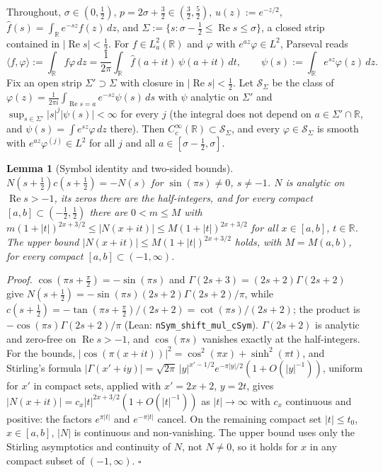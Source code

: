 \documentclass[11pt,a4paper]{article}
\newtheorem{lem}{Lemma}[section]
\begin{document}
Throughout, $\sigma\in(0,\tfrac12)$, $p=2\sigma+\tfrac32\in(\tfrac32,\tfrac52)$, $u(z):=e^{-z/2}$,
$\widehat{f}(s)=\int_{\mathbb{R}}e^{-sz}f(z)\,dz$, and $\Sigma:=\{s:\sigma-\tfrac12\le\operatorname{Re}s\le\sigma\}$, a closed
strip contained in $|\operatorname{Re}s|<\tfrac12$.  For $f\in L^2_a(\mathbb{R})$ and $\varphi$ with $e^{az}\varphi\in L^2$, Parseval reads
\begin{equation}\label{eq:conj_parseval}
\langle f,\varphi\rangle:=\int_{\mathbb{R}}f\varphi\,dz=\frac{1}{2\pi}\int_{\mathbb{R}}\widehat{f}(a+it)\,\psi(a+it)\,dt,
\qquad \psi(s):=\int_{\mathbb{R}}e^{sz}\varphi(z)\,dz .
\end{equation}
Fix an open strip $\Sigma'\supset\Sigma$ with closure in $|\operatorname{Re}s|<\tfrac12$.  Let $\mathcal{S}_\Sigma$ be the class of
$\varphi(z)=\frac{1}{2\pi i}\int_{\operatorname{Re}s=a}e^{-sz}\psi(s)\,ds$ with $\psi$ analytic on $\Sigma'$ and
$\sup_{s\in\Sigma'}|s|^j|\psi(s)|<\infty$ for every $j$ (the integral does not depend on $a\in\Sigma'\cap\mathbb{R}$, and
$\psi(s)=\int e^{sz}\varphi\,dz$ there).  Then $C_c^\infty(\mathbb{R})\subset\mathcal{S}_\Sigma$, and every
$\varphi\in\mathcal{S}_\Sigma$ is smooth with $e^{az}\varphi^{(j)}\in L^2$ for all $j$ and all $a\in[\sigma-\tfrac12,\sigma]$.

\begin{lem}[Symbol identity and two-sided bounds]\label{lem:conj_symbol}
$N(s+\tfrac12)c(s+\tfrac12)=-N(s)$ for $\sin(\pi s)\ne0$, $s\ne-1$.  $N$ is analytic on $\operatorname{Re}s>-1$, its zeros
there are the half-integers, and for every compact $[a,b]\subset(-\tfrac12,\tfrac12)$ there are $0<m\le M$ with
$m(1+|t|)^{2x+3/2}\le|N(x+it)|\le M(1+|t|)^{2x+3/2}$ for all $x\in[a,b]$, $t\in\mathbb{R}$.
The upper bound $|N(x+it)|\le M(1+|t|)^{2x+3/2}$ holds, with $M=M(a,b)$, for every compact $[a,b]\subset(-1,\infty)$.
\end{lem}
\textit{Proof.}
$\cos(\pi s+\tfrac{\pi}{2})=-\sin(\pi s)$ and $\Gamma(2s+3)=(2s+2)\Gamma(2s+2)$ give
$N(s+\tfrac12)=-\sin(\pi s)(2s+2)\Gamma(2s+2)/\pi$, while $c(s+\tfrac12)=-\tan(\pi s+\tfrac{\pi}{2})/(2s+2)=\cot(\pi s)/(2s+2)$;
the product is $-\cos(\pi s)\Gamma(2s+2)/\pi$ (Lean: \texttt{nSym\_shift\_mul\_cSym}).
$\Gamma(2s+2)$ is analytic and zero-free on $\operatorname{Re}s>-1$, and $\cos(\pi s)$ vanishes exactly at the half-integers.
For the bounds, $|\cos(\pi(x+it))|^2=\cos^2(\pi x)+\sinh^2(\pi t)$, and Stirling's formula
$|\Gamma(x'+iy)|=\sqrt{2\pi}\,|y|^{x'-1/2}e^{-\pi|y|/2}(1+O(|y|^{-1}))$, uniform for $x'$ in compact sets, applied with
$x'=2x+2$, $y=2t$, gives $|N(x+it)|=c_x|t|^{2x+3/2}(1+O(|t|^{-1}))$ as $|t|\to\infty$ with $c_x$ continuous and positive: the
factors $e^{\pi|t|}$ and $e^{-\pi|t|}$ cancel.  On the remaining compact set $|t|\le t_0$, $x\in[a,b]$, $|N|$ is continuous and
non-vanishing.  The upper bound uses only the Stirling asymptotics and continuity of $N$, not $N\ne0$, so it holds for
$x$ in any compact subset of $(-1,\infty)$. \hfill$\square$
\end{document}

